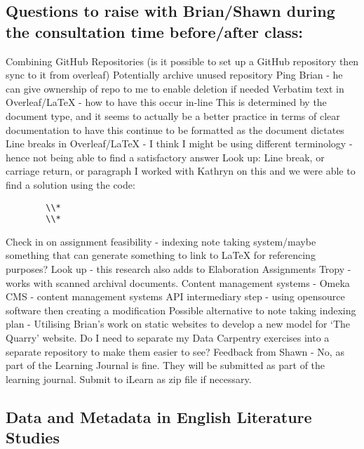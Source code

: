 \documentclass{article}
\begin{document}
\subsection{Questions to raise with Brian/Shawn during the consultation time before/after class:}
\label{ Error: GitHub Troubleshooting - Redundant Repository}
\begin{outline}[enumerate]
    \1 Combining GitHub Repositories (is it possible to set up a GitHub repository then sync to it from overleaf)
        \2 Potentially archive unused repository
        \2 Ping Brian - he can give ownership of repo to me to enable deletion if needed
    \1 Verbatim text in Overleaf/LaTeX - how to have this occur in-line
        \2 This is determined by the document type, and it seems to actually be a better practice in terms of clear documentation to have this continue to be formatted as the document dictates
    \1 Line breaks in Overleaf/LaTeX - I think I might be using different terminology - hence not being able to find a satisfactory answer
        \2 Look up:
            \3 Line break, or carriage return, or paragraph
            \3 I worked with Kathryn on this and we were able to find a solution using the code:
    \begin{verbatim}
        \\*
        \\*
    \end{verbatim}
    \1 Check in on assignment feasibility - indexing note taking system/maybe something that can generate something to link to LaTeX for referencing purposes?
        \2 Look up - this research also adds to Elaboration Assignments
            \3 Tropy - works with scanned archival documents. 
            \3 Content management systems - Omeka
            \3 CMS - content management systems
            \3 API intermediary step - using opensource software then creating a modification
            \3 Possible alternative to note taking indexing plan - Utilising Brian's work on static websites to develop a new model for `The Quarry' website.
    \1 Do I need to separate my Data Carpentry exercises into a separate repository to make them easier to see?
        \2 Feedback from Shawn - No, as part of the Learning Journal is fine. They will be submitted as part of the learning journal. Submit to iLearn as zip file if necessary.
\end{outline}
    
\subsection{Data and Metadata in English Literature Studies}
\end{document}
